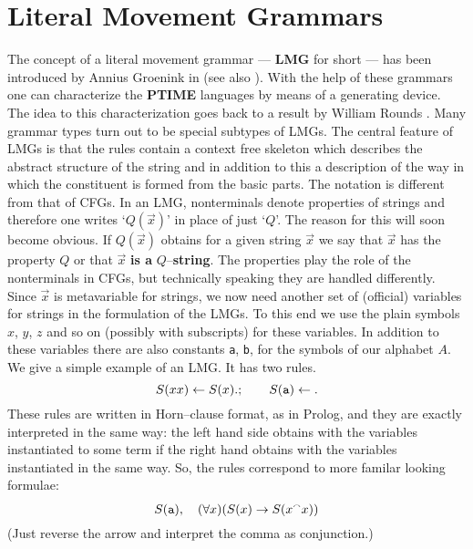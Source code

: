 \section{Literal Movement Grammars}
\label{kap4-2}
%
%
%
The concept of a literal movement grammar --- \textbf{LMG} for short 
--- has been introduced by Annius Groenink in  
(see also \cite{groenink:lmgs}). With the help of these grammars one 
can characterize the \textbf{PTIME} languages by means of a generating 
device. The idea to this characterization goes back to a result by
William Rounds . 
Many grammar types
turn out to be special subtypes of LMGs. The central feature of 
LMGs is that the rules contain a context free skeleton which describes 
the abstract structure of the string and in addition to this
a description of the way in which the constituent is formed
from the basic parts. The notation is different from that of 
CFGs. In an LMG, nonterminals denote properties 
of strings and therefore one writes `$Q(\vec{x})$' in place 
of just `$Q$'. The reason for this will soon become obvious. 
If $Q(\vec{x})$ obtains for a given string $\vec{x}$ we say 
that $\vec{x}$ has the property $Q$ or that $\vec{x}$ \textbf{is a}
$Q$--\textbf{string}. The properties play the role of the 
nonterminals in CFGs, but technically speaking they are 
handled differently. Since $\vec{x}$ is metavariable for strings, 
we now need another set of (official) variables for strings in the 
formulation of the LMGs. To this end we use the plain symbols $x$, 
$y$, $z$ and so on (possibly with subscripts) for these variables. 
In addition to these variables there are also constants {\tt a}, 
{\tt b}, for the symbols of our alphabet $A$. We give a simple 
example of an LMG. It has two rules.
\begin{equation}
S(xx) \leftarrow S(x).; \qquad S(\mbox{\tt a}) \leftarrow.
\end{equation}
These rules are written in Horn--clause format, as in Prolog, 
and they are exactly interpreted in the same way: the left hand side 
obtains with the variables instantiated to some term if the right 
hand obtains with the variables instantiated in the same way. 
So, the rules correspond to more familar looking formulae:
\begin{equation}
S(\mbox{\tt a}), \quad (\forall x)(S(x) \rightarrow S(x {^{\smallfrown}} x))
\end{equation}
(Just reverse the arrow and interpret the comma as conjunction.)
